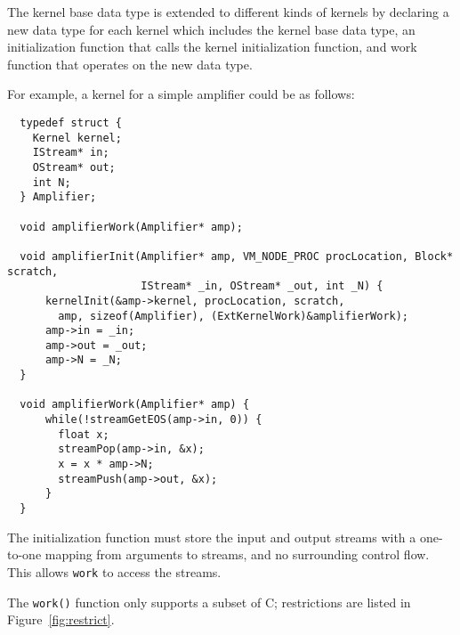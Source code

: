 The kernel base data type is extended to different kinds of 
kernels by declaring a new data type for each kernel 
which includes the kernel base data type,
an initialization function that calls the kernel 
initialization function, and work function that 
operates on the new data type. 

For example, a kernel for a simple amplifier could be as follows:

{\small
\begin{verbatim}
  typedef struct {
    Kernel kernel;
    IStream* in;
    OStream* out;
    int N;
  } Amplifier;

  void amplifierWork(Amplifier* amp);

  void amplifierInit(Amplifier* amp, VM_NODE_PROC procLocation, Block* scratch, 
                     IStream* _in, OStream* _out, int _N) {
      kernelInit(&amp->kernel, procLocation, scratch, 
        amp, sizeof(Amplifier), (ExtKernelWork)&amplifierWork);
      amp->in = _in;
      amp->out = _out;
      amp->N = _N;
  }

  void amplifierWork(Amplifier* amp) {
      while(!streamGetEOS(amp->in, 0)) {
        float x;
        streamPop(amp->in, &x);
        x = x * amp->N;
        streamPush(amp->out, &x);
      }
  }
\end{verbatim}}


The initialization function must store the input and output streams with a one-to-one mapping from arguments to streams, and no surrounding control flow.  This allows {\tt work} to access the streams.

The {\tt work()} function only supports a subset of C; restrictions are listed in Figure~\ref{fig:restrict}.  

